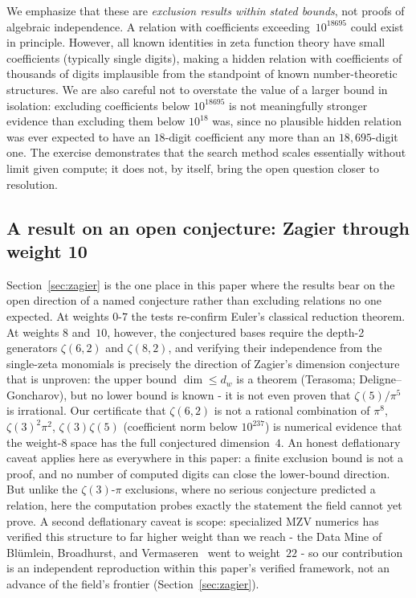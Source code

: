 \documentclass[12pt]{article}
\theoremstyle{definition}
\theoremstyle{remark}
\begin{document}
We emphasize that these are \emph{exclusion results within stated
bounds}, not proofs of algebraic independence.  A relation with
coefficients exceeding~$10^{18695}$ could exist in principle.  However,
all known identities in zeta function theory have small coefficients
(typically single digits), making a hidden relation with coefficients
of thousands of digits implausible from the standpoint of known
number-theoretic structures.  We are also careful not to overstate the
value of a larger bound in isolation: excluding coefficients below
$10^{18695}$ is not meaningfully stronger evidence than excluding them
below $10^{18}$ was, since no plausible hidden relation was ever
expected to have an $18$-digit coefficient any more than an
$18{,}695$-digit one.  The exercise demonstrates that the search method
scales essentially without limit given compute; it does not, by
itself, bring the open question closer to resolution.

\subsection{A result on an open conjecture: Zagier through weight 10}

Section~\ref{sec:zagier} is the one place in this paper where the
results bear on the open direction of a named conjecture rather than
excluding relations no one expected.  At weights $0$-$7$ the tests
re-confirm Euler's classical reduction theorem.  At weights $8$
and~$10$, however, the conjectured bases require the depth-2
generators $\zeta(6,2)$ and $\zeta(8,2)$, and verifying their
independence from the single-zeta monomials is precisely the
direction of Zagier's dimension conjecture that is unproven: the
upper bound $\dim\le d_w$ is a theorem (Terasoma;
Deligne--Goncharov), but no lower bound is known - it is not even
proven that $\zeta(5)/\pi^5$ is irrational.  Our certificate that
$\zeta(6,2)$ is not a rational combination of $\pi^8$,
$\zeta(3)^2\pi^2$, $\zeta(3)\zeta(5)$ (coefficient norm below
$10^{237}$) is numerical evidence that the weight-8 space has the
full conjectured dimension~$4$.  An honest deflationary caveat
applies here as everywhere in this paper: a finite exclusion bound is
not a proof, and no number of computed digits can close the
lower-bound direction.  But unlike the $\zeta(3)$-$\pi$ exclusions,
where no serious conjecture predicted a relation, here the
computation probes exactly the statement the field cannot yet prove.
A second deflationary caveat is scope: specialized MZV numerics has
verified this structure to far higher weight than we reach - the
Data Mine of Bl\"umlein, Broadhurst, and
Vermaseren~\cite{BBV2010} went to weight~$22$ - so our contribution
is an independent reproduction within this paper's verified
framework, not an advance of the field's frontier
(Section~\ref{sec:zagier}).
\end{document}
